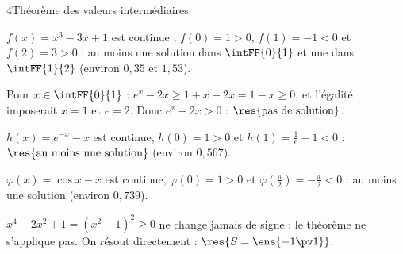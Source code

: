 \begin{deuxcolonnes}
\begin{corrige}{4}{Théorème des valeurs intermédiaires}
\begin{questions}
  \item $f(x)=x^{3}-3x+1$ est continue ; $f(0)=1>0$, $f(1)=-1<0$ et $f(2)=3>0$ : au moins une solution dans
    $\intFF{0}{1}$ et une dans $\intFF{1}{2}$ (environ $0{,}35$ et $1{,}53$).
  \item Pour $x\in\intFF{0}{1}$ : $e^{x}-2x\geq1+x-2x=1-x\geq0$, et l'égalité imposerait $x=1$ et $e=2$.
    Donc $e^{x}-2x>0$ : $\res{\text{pas de solution}}$.
  \item $h(x)=e^{-x}-x$ est continue, $h(0)=1>0$ et $h(1)=\frac1e-1<0$ : $\res{\text{au moins une solution}}$ (environ $0{,}567$).
  \item $\varphi(x)=\cos x-x$ est continue, $\varphi(0)=1>0$ et $\varphi\left(\frac\pi2\right)=-\frac\pi2<0$ : au moins une solution
    (environ $0{,}739$).
  \item $x^{4}-2x^{2}+1=\left(x^{2}-1\right)^{2}\geq0$ ne change jamais de signe : le théorème ne s'applique pas.
    On résout directement : $\res{S=\ens{-1\pv1}}$.
\end{questions}
\end{corrige}

\end{deuxcolonnes}

